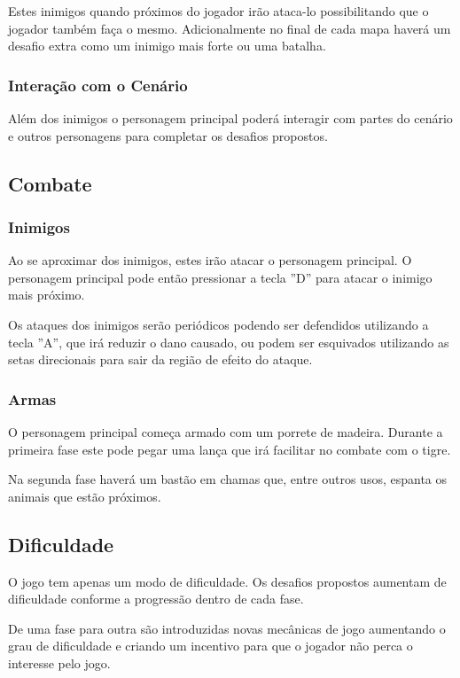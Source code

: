 Estes inimigos quando próximos do jogador irão ataca-lo possibilitando que o jogador também faça o mesmo. 
Adicionalmente no final de cada mapa haverá um desafio extra como um inimigo mais forte ou uma batalha.  

\subsubsection {Interação com o Cenário}

Além dos inimigos o personagem principal poderá interagir com partes do cenário e outros personagens para completar os
desafios propostos.

\subsection {Combate}
\subsubsection{Inimigos}
Ao se aproximar dos inimigos, estes irão atacar o personagem principal. O personagem principal pode então pressionar a tecla ''D'' para atacar o inimigo mais 
próximo.

Os ataques dos inimigos serão periódicos podendo ser defendidos utilizando a tecla ''A'', que irá reduzir o dano causado, ou podem ser esquivados utilizando as 
setas direcionais para sair da região de efeito do ataque.

\subsubsection {Armas}
O personagem principal começa armado com um porrete de madeira. Durante a primeira fase este pode pegar uma lança que irá facilitar no combate com o tigre. 

Na segunda fase haverá um bastão em chamas que, entre outros usos, espanta os animais que estão próximos.

\subsection {Dificuldade}

O jogo tem apenas um modo de dificuldade. Os desafios propostos aumentam de dificuldade conforme a progressão dentro de cada fase.

De uma fase para outra são introduzidas novas mecânicas de jogo aumentando o grau de dificuldade e criando um incentivo para que o jogador 
não perca o interesse pelo jogo.

